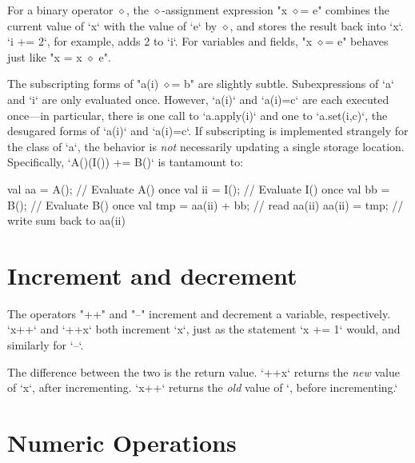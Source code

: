 For a binary operator $\diamond$, the $\diamond$-assignment expression
\xcdmath"x $\diamond$= e" combines the current value of \xcd`x` with the value
of \xcd`e` by {$\diamond$}, and stores the result back into \xcd`x`.  
\xcd`i += 2`, for example, adds 2 to \xcd`i`. For variables and fields, 
\xcdmath"x $\diamond$= e" behaves just like \xcdmath"x = x $\diamond$ e". 

The subscripting forms of \xcdmath"a(i) $\diamond$= b" are slightly subtle.
Subexpressions of \xcd`a` and \xcd`i` are only evaluated once.  However,
\xcd`a(i)` and \xcd`a(i)=c` are each executed once---in particular, there is
one call to \xcd`a.apply(i)` and one to \xcd`a.set(i,c)`, the desugared forms
of \xcd`a(i)` and \xcd`a(i)=c`.  If subscripting is implemented strangely for
the class of \xcd`a`, the behavior is {\em not} necessarily updating a single
storage location. Specifically, \xcd`A()(I()) += B()` is tantamount to: 
\begin{xten}
{
  val aa = A();  // Evaluate A() once
  val ii = I();  // Evaluate I() once
  val bb = B();  // Evaluate B() once
  val tmp = aa(ii) + bb; // read aa(ii)
  aa(ii) = tmp;  // write sum back to aa(ii)
}
\end{xten}





\section{Increment and decrement}
\index{\Xcd{++}}
\index{\Xcd{--}}


The operators \xcd"++" and \xcd"--" increment and decrement
a variable, respectively.  
\xcd`x++` and \xcd`++x` both increment \xcd`x`, just as the statement 
\xcd`x += 1` would, and similarly for \xcd`--`.  

The difference between the two is the return value.  
\xcd`++x` returns the {\em new} value of \xcd`x`, after incrementing.
\xcd`x++` returns the {\em old} value of \xcd`, before incrementing.`


\section{Numeric Operations}
\label{XtenPromotions}

